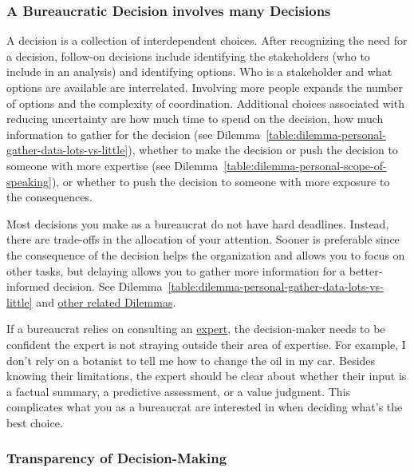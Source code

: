 \subsubsection*{A Bureaucratic Decision involves many Decisions}

A decision is a collection of interdependent choices. After recognizing the need for a decision, follow-on decisions include identifying the stakeholders (who to include in an analysis) and identifying options. Who is a stakeholder and what options are available are interrelated. Involving more people expands the number of options and the complexity of coordination. Additional choices associated with reducing uncertainty are how much time to spend on the decision, how much information to gather for the decision (see Dilemma~\ref{table:dilemma-personal-gather-data-lots-vs-little}),
whether to make the decision or push the decision to someone with more expertise (see Dilemma~\ref{table:dilemma-personal-scope-of-speaking}), or whether to push the decision to someone with more exposure to the consequences.

Most decisions you make as a bureaucrat do not have hard deadlines. Instead, there are trade-offs in the allocation of your attention. Sooner is preferable since the consequence of the decision helps the organization and allows you to focus on other tasks, but delaying allows you to gather more information for a better-informed decision. See 
Dilemma~\ref{table:dilemma-personal-gather-data-lots-vs-little}
and \hyperref[sec:dilemma-trilemma]{other related Dilemmas}.


If a bureaucrat relies on consulting an
\hyperref[sec:expertise]{expert},
the decision-maker needs to be confident the expert is not  straying outside their area of expertise. For example, I don't rely on a botanist  to tell me how to change the oil in my car. 
Besides knowing their limitations, the expert should be clear about whether their input is a factual summary, a predictive assessment, or a value judgment. This complicates what you as a bureaucrat are interested in when deciding what's the best choice.


\subsubsection*{Transparency of Decision-Making\label{sec:transparency-of-decisions}}

